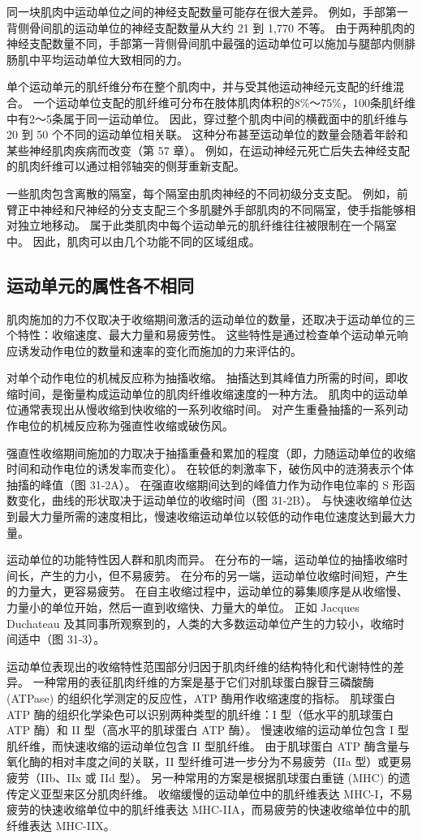 同一块肌肉中运动单位之间的神经支配数量可能存在很大差异。 例如，手部第一背侧骨间肌的运动单位的神经支配数量从大约 21 到 1,770 不等。 由于两种肌肉的神经支配数量不同，手部第一背侧骨间肌中最强的运动单位可以施加与腿部内侧腓肠肌中平均运动单位大致相同的力。

单个运动单元的肌纤维分布在整个肌肉中，并与受其他运动神经元支配的纤维混合。 一个运动单位支配的肌纤维可分布在肢体肌肉体积的8\%～75\%，100条肌纤维中有2～5条属于同一运动单位。 因此，穿过整个肌肉中间的横截面中的肌纤维与 20 到 50 个不同的运动单位相关联。 这种分布甚至运动单位的数量会随着年龄和某些神经肌肉疾病而改变（第 57 章）。 例如，在运动神经元死亡后失去神经支配的肌肉纤维可以通过相邻轴突的侧芽重新支配。

一些肌肉包含离散的隔室，每个隔室由肌肉神经的不同初级分支支配。 例如，前臂正中神经和尺神经的分支支配三个多肌腱外手部肌肉的不同隔室，使手指能够相对独立地移动。 属于此类肌肉中每个运动单元的肌纤维往往被限制在一个隔室中。 因此，肌肉可以由几个功能不同的区域组成。

\subsection{运动单元的属性各不相同}
肌肉施加的力不仅取决于收缩期间激活的运动单位的数量，还取决于运动单位的三个特性：收缩速度、最大力量和易疲劳性。 这些特性是通过检查单个运动单元响应诱发动作电位的数量和速率的变化而施加的力来评估的。

对单个动作电位的机械反应称为抽搐收缩。 抽搐达到其峰值力所需的时间，即收缩时间，是衡量构成运动单位的肌肉纤维收缩速度的一种方法。 肌肉中的运动单位通常表现出从慢收缩到快收缩的一系列收缩时间。 对产生重叠抽搐的一系列动作电位的机械反应称为强直性收缩或破伤风。

强直性收缩期间施加的力取决于抽搐重叠和累加的程度（即，力随运动单位的收缩时间和动作电位的诱发率而变化）。 在较低的刺激率下，破伤风中的涟漪表示个体抽搐的峰值（图 31-2A）。 在强直收缩期间达到的峰值力作为动作电位率的 S 形函数变化，曲线的形状取决于运动单位的收缩时间（图 31-2B）。 与快速收缩单位达到最大力量所需的速度相比，慢速收缩运动单位以较低的动作电位速度达到最大力量。

运动单位的功能特性因人群和肌肉而异。 在分布的一端，运动单位的抽搐收缩时间长，产生的力小，但不易疲劳。 在分布的另一端，运动单位收缩时间短，产生的力量大，更容易疲劳。 在自主收缩过程中，运动单位的募集顺序是从收缩慢、力量小的单位开始，然后一直到收缩快、力量大的单位。 正如 Jacques Duchateau 及其同事所观察到的，人类的大多数运动单位产生的力较小，收缩时间适中（图 31-3）。

运动单位表现出的收缩特性范围部分归因于肌肉纤维的结构特化和代谢特性的差异。 一种常用的表征肌肉纤维的方案是基于它们对肌球蛋白腺苷三磷酸酶 (ATPase) 的组织化学测定的反应性，ATP 酶用作收缩速度的指标。 肌球蛋白 ATP 酶的组织化学染色可以识别两种类型的肌纤维：I 型（低水平的肌球蛋白 ATP 酶）和 II 型（高水平的肌球蛋白 ATP 酶）。 慢速收缩的运动单位包含 I 型肌纤维，而快速收缩的运动单位包含 II 型肌纤维。 由于肌球蛋白 ATP 酶含量与氧化酶的相对丰度之间的关联，II 型纤维可进一步分为不易疲劳（IIa 型）或更易疲劳（IIb、IIx 或 IId 型）。 另一种常用的方案是根据肌球蛋白重链 (MHC) 的遗传定义亚型来区分肌肉纤维。 收缩缓慢的运动单位中的肌纤维表达 MHC-I，不易疲劳的快速收缩单位中的肌纤维表达 MHC-IIA，而易疲劳的快速收缩单位中的肌纤维表达 MHC-IIX。

